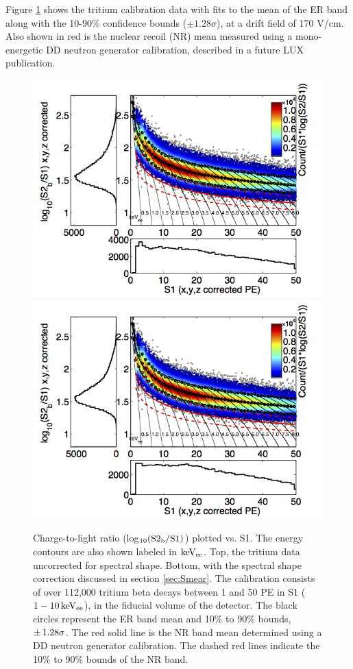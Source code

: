 Figure \ref{fig:Band} shows the tritium calibration data with fits to the mean of the ER band along with the 10-90\% confidence bounds ($\pm 1.28\sigma$), at a drift field of 170 V/cm. Also shown in red is the nuclear recoil (NR) mean measured using a mono-energetic DD neutron generator calibration, described in a future LUX publication.


\renewcommand{\baselinestretch}{1}
\small\normalsize
\begin{figure}[p!]\centering
\includegraphics[width=120mm]{Chapter_T/Figures/ER_Band/CH3T_fid_50_rawSpec.png}
\includegraphics[width=120mm]{Chapter_T/Figures/ER_Band/CH3T_fid_50_proj.png}
\caption{Charge-to-light ratio (log$\rm _{10}(S2_b/S1)$) plotted vs. S1. The energy contours are also shown labeled in $\rm keV_{ee}$. Top, the tritium data uncorrected for spectral shape. Bottom, with the spectral shape correction discussed in section \ref{sec:Smear}. The calibration consists of over 112,000 tritium beta decays between 1 and 50 PE in S1 ($\rm1-10 \, keV_{ee}$), in the fiducial volume of the detector. The black circles represent the ER band mean and 10\% to 90\% bounds, $\rm \pm \,1.28\sigma$. The red solid line is the NR band mean determined using a DD neutron generator calibration. The dashed red lines indicate the 10\% to 90\% bounds of the NR band.}
\label{fig:Band}
\end{figure}
\renewcommand{\baselinestretch}{2}
\small\normalsize
\newpage

